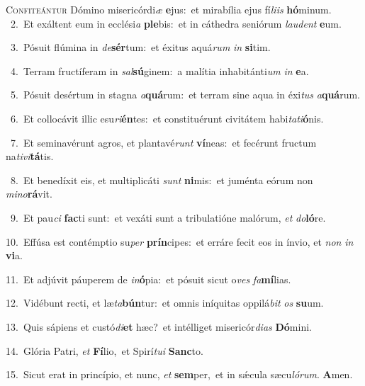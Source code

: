 \lettrine{\initial\textcolor{\initialcolor}{C}}{onfiteántur} Dómino misericórdi\textit{æ} \textbf{e}\-jus:~\star et mirabília ejus fí\-\textit{li}\-\textit{is} \textbf{hó}\-minum.\\
{\numbfont\textcolor{\numbcolor}{~2.}}~Et exáltent eum in ecclési\textit{a} \textbf{ple}\-bis:~\star et in cáthedra seniórum \textit{lau}\-\textit{dent} \textbf{e}\-um.\par
{\numbfont\textcolor{\numbcolor}{~3.}}~Pósuit flúmina in \textit{de}\-\textbf{sér}tum:~\star et éxitus aquá\textit{rum} \textit{in} \textbf{si}\-tim.\par
{\numbfont\textcolor{\numbcolor}{~4.}}~Terram fructíferam in \textit{sal}\-\textbf{sú}ginem:~\star a malítia inhabitánti\textit{um} \textit{in} \textbf{e}\-a.\par
{\numbfont\textcolor{\numbcolor}{~5.}}~Pósuit desértum in stagna \textit{a}\-\textbf{quá}rum:~\star et terram sine aqua in éxi\textit{tus} \textit{a}\-\textbf{quá}rum.\par
{\numbfont\textcolor{\numbcolor}{~6.}}~Et collocávit illic esu\-\textit{ri}\-\textbf{én}tes:~\star et constituérunt civitátem habi\-\textit{ta}\-\textit{ti}\textbf{ó}nis.\par
{\numbfont\textcolor{\numbcolor}{~7.}}~Et seminavérunt agros, et plantavé\textit{runt} \textbf{ví}\-neas:~\star et fecérunt fructum na\-\textit{ti}\-\textit{vi}\textbf{tá}tis.\par
{\numbfont\textcolor{\numbcolor}{~8.}}~Et benedíxit eis, et multiplicáti \textit{sunt} \textbf{ni}\-mis:~\star et juménta eórum non \textit{mi}\-\textit{no}\textbf{rá}vit.\par
{\numbfont\textcolor{\numbcolor}{~9.}}~Et pau\textit{ci} \textbf{fac}\-ti sunt:~\star et vexáti sunt a tribulatióne malórum, \textit{et} \textit{do}\-\textbf{ló}re.\par
{\numbfont\textcolor{\numbcolor}{10.}}~Effúsa est contémptio su\textit{per} \textbf{prín}\-cipes:~\star et erráre fecit eos in ínvio, et \textit{non} \textit{in} \textbf{vi}\-a.\par
{\numbfont\textcolor{\numbcolor}{11.}}~Et adjúvit páuperem de \textit{in}\-\textbf{ó}pia:~\star et pósuit sicut o\textit{ves} \textit{fa}\-\textbf{mí}lias.\par
{\numbfont\textcolor{\numbcolor}{12.}}~Vidébunt recti, et læ\-\textit{ta}\-\textbf{bún}tur:~\star et omnis iníquitas oppilá\textit{bit} \textit{os} \textbf{su}\-um.\par
{\numbfont\textcolor{\numbcolor}{13.}}~Quis sápiens et custó\-\textit{di}\-\textbf{et} hæc?~\star et intélliget misericór\-\textit{di}\-\textit{as} \textbf{Dó}\-mini.\par
{\numbfont\textcolor{\numbcolor}{14.}}~Glória Patri, \textit{et} \textbf{Fí}\-lio,~\star et Spirí\-\textit{tu}\-\textit{i} \textbf{Sanc}\-to.\par
{\numbfont\textcolor{\numbcolor}{15.}}~Sicut erat in princípio, et nunc, \textit{et} \textbf{sem}\-per,~\star et in sǽcula sæcu\-\textit{ló}\-\textit{rum}. \textbf{A}\-men.\par
